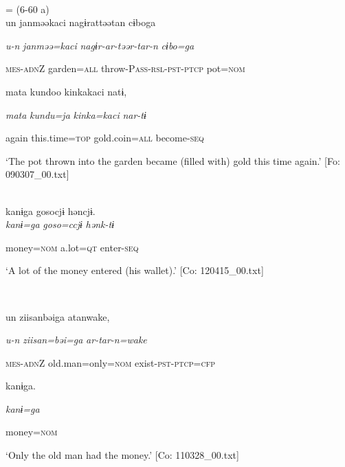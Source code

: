 \ea\label{ex:6-138}
\ea{}\\
\gll = (6-60 a)\\

{\TM}
\gll un  janməəkaci  nagɨrattəətan  cɨboga

      \textit{u-n}  \textit{janməə=kaci}  \textit{nagɨr-ar-təər-tar-n}  \textit{cɨbo=ga}

      \textsc{mes}-\textsc{adn}Z  garden=\textsc{all}  throw-P\textsc{ass}-\textsc{rsl}-\textsc{pst}-\textsc{ptcp}  pot=\textsc{nom}

      mata  kundoo  kinkakaci  natɨ,

      \textit{mata}  \textit{kundu=ja}  \textit{kinka=kaci}  \textit{nar-tɨ}

      again  this.time=\textsc{top}  gold.coin=\textsc{all}  become-\textsc{seq}

\glt ‘The pot thrown into the garden became (filled with) gold this time again.’ [Fo: 090307\_00.txt]
\z

 \ex{}\\
{\TM}
\gll  kanɨga  {\textbar}goso{\textbar}cjɨ  həncjɨ.\\

      \textit{kanɨ=ga}  \textit{goso=ccjɨ}  \textit{hənk-tɨ}

      money=\textsc{nom}  a.lot=\textsc{qt}  enter-\textsc{seq}

\glt ‘A lot of the money entered (his wallet).’ [Co: 120415\_00.txt]
\z

 \ex{}\\
\gll

{\US}
un  ziisanbəiga  atanwake,

      \textit{u-n}  \textit{ziisan=bəi=ga}  \textit{ar-tar-n=wake}

      \textsc{mes}-\textsc{adn}Z  old.man=only=\textsc{nom}  exist-\textsc{pst}-\textsc{ptcp}=\textsc{cfp}

      kanɨga.

      \textit{kanɨ=ga}

      money=\textsc{nom}

\glt ‘Only the old man had the money.’ [Co: 110328\_00.txt]
\z
